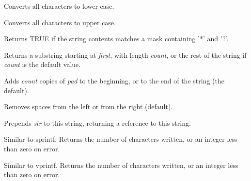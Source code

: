
Converts all characters to lower case.

\label{wxstringmakeupper}


Converts all characters to upper case.

\label{wxstringMatches}


Returns TRUE if the string contents matches a mask containing '*' and '?'.

\label{wxstringmid}


Returns a substring starting at {\it first}, with length {\it count}, or the rest of
the string if {\it count} is the default value.

\label{wxstringpad}


Adds {\it count} copies of {\it pad} to the beginning, or to the end of the string (the default).

Removes spaces from the left or from the right (default).

\label{wxstringPrepend}


Prepends {\it str} to this string, returning a reference to this string.

\label{wxstringprintf}


Similar to sprintf. Returns the number of characters written, or an integer less than zero
on error.

\label{wxstringprintfv}


Similar to vprintf. Returns the number of characters written, or an integer less than zero
on error.


